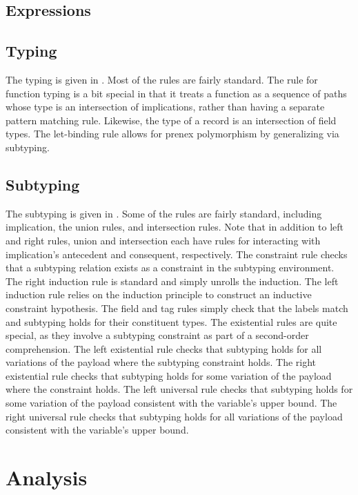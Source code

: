 \documentclass[sigplan,screen,review]{acmart}
\begin{document}
\subsection{Expressions}

\subsection{Typing}
The typing is given in .
Most of the rules are fairly standard. 
The rule for function typing is a bit special in that
it treats a function as a sequence of paths whose type is an intersection of implications,
rather than having a separate pattern matching rule. 
Likewise, the type of a record is an intersection of field types.
The let-binding rule allows for prenex polymorphism by generalizing via subtyping. 

\subsection{Subtyping}
The subtyping is given in .
Some of the rules are fairly standard, including implication, the union rules, and intersection rules.
Note that in addition to left and right rules, union and intersection each have rules for 
interacting with implication's antecedent and consequent, respectively.
The constraint rule checks that a subtyping relation exists as a constraint in the subtyping environment.
The right induction rule is standard and simply unrolls the induction.
The left induction rule relies on the induction principle to construct an 
inductive constraint hypothesis.  
The field and tag rules simply check that the labels match and subtyping holds for their constituent types.
The existential rules are quite special, as they involve a subtyping constraint as part of 
a second-order comprehension. 
The left existential rule checks that subtyping holds for all variations of the payload 
where the subtyping constraint holds. 
The right existential rule checks that subtyping holds for some variation of the payload where the constraint holds.
The left universal rule checks that subtyping holds for some variation of the payload consistent with
the variable's upper bound. 
The right universal rule checks that subtyping holds for all variations of the payload consistent with
the variable's upper bound.


\section{Analysis}
\end{document}
